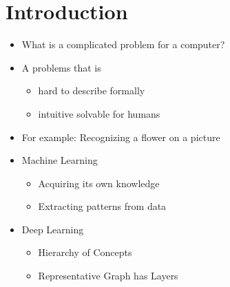 \documentclass[handout]{beamer}
\begin{document}
\section{Introduction}
\begin{frame}
    \begin{itemize}[<+->]
        \item What is a complicated problem for a computer?
        \item A problems that is
        \begin{itemize}[<+->]
            \item hard to describe formally
            \item intuitive solvable for humans
        \end{itemize}
        \item For example: Recognizing a flower on a picture
        \item Machine Learning
        \begin{itemize}[<+->]
            \item Acquiring its own knowledge
            \item Extracting patterns from data
        \end{itemize}
        \item Deep Learning
        \begin{itemize}[<+->]
            \item Hierarchy of Concepts
            \item Representative Graph has Layers
        \end{itemize}
    \end{itemize}
\end{frame}
\end{document}
